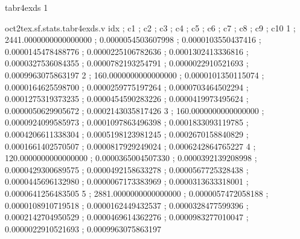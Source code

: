 \expandafter\def\csname oct2tex.sf.stats.tabr4exds.t\endcsname{tabr4exds}
\expandafter\def\csname oct2tex.sf.stats.tabr4exds.u\endcsname{1}
\begin{filecontents}[overwrite]{oct2tex.sf.stats.tabr4exds.v}
idx ; c1 ; c2 ; c3 ; c4 ; c5 ; c6 ; c7 ; c8 ; c9 ; c10
1 ; 2441.0000000000000000 ; 0.0000054503607998 ; 0.0000103550437416 ; 0.0000145478488776 ; 0.0000225106782636 ; 0.0001302413336816 ; 0.0000327536084355 ; 0.0000782193254791 ; 0.0000022910521693 ; 0.0009963075863197
2 ; 160.0000000000000000 ; 0.0000101350115074 ; 0.0000164625598700 ; 0.0000259775197264 ; 0.0000703464502294 ; 0.0001275319373235 ; 0.0000454590283226 ; 0.0000419973495624 ; 0.0000050629905672 ; 0.0002143035817426
3 ; 160.0000000000000000 ; 0.0000924099585973 ; 0.0001097863496398 ; 0.0001833093119785 ; 0.0004206611338304 ; 0.0005198123981245 ; 0.0002670158840829 ; 0.0001661402570507 ; 0.0000817929249024 ; 0.0006242864765227
4 ; 120.0000000000000000 ; 0.0000365004507330 ; 0.0000392139208998 ; 0.0000429300689575 ; 0.0000492158633278 ; 0.0000567725328438 ; 0.0000445696132980 ; 0.0000067173383969 ; 0.0000313633318001 ; 0.0000641256483505
5 ; 2881.0000000000000000 ; 0.0000057472058188 ; 0.0000108910719518 ; 0.0000162449432537 ; 0.0000328477599396 ; 0.0002142704950529 ; 0.0000469614362276 ; 0.0000983277010047 ; 0.0000022910521693 ; 0.0009963075863197
\end{filecontents}
